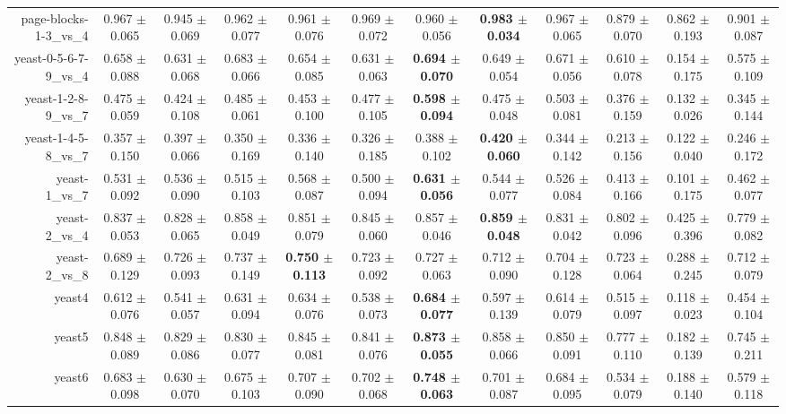 \begin{table}[!ht]
{\begin{tabular}{r c c c c c c c c c c c}
page-blocks-1-3\_vs\_4 & 0.967 $\pm$ 0.065 & 0.945 $\pm$ 0.069 & 0.962 $\pm$ 0.077 & 0.961 $\pm$ 0.076 & 0.969 $\pm$ 0.072 & 0.960 $\pm$ 0.056 & \textbf{0.983 $\pm$ 0.034} & 0.967 $\pm$ 0.065 & 0.879 $\pm$ 0.070 & 0.862 $\pm$ 0.193 & 0.901 $\pm$ 0.087 \\
yeast-0-5-6-7-9\_vs\_4 & 0.658 $\pm$ 0.088 & 0.631 $\pm$ 0.068 & 0.683 $\pm$ 0.066 & 0.654 $\pm$ 0.085 & 0.631 $\pm$ 0.063 & \textbf{0.694 $\pm$ 0.070} & 0.649 $\pm$ 0.054 & 0.671 $\pm$ 0.056 & 0.610 $\pm$ 0.078 & 0.154 $\pm$ 0.175 & 0.575 $\pm$ 0.109 \\
yeast-1-2-8-9\_vs\_7 & 0.475 $\pm$ 0.059 & 0.424 $\pm$ 0.108 & 0.485 $\pm$ 0.061 & 0.453 $\pm$ 0.100 & 0.477 $\pm$ 0.105 & \textbf{0.598 $\pm$ 0.094} & 0.475 $\pm$ 0.048 & 0.503 $\pm$ 0.081 & 0.376 $\pm$ 0.159 & 0.132 $\pm$ 0.026 & 0.345 $\pm$ 0.144 \\
yeast-1-4-5-8\_vs\_7 & 0.357 $\pm$ 0.150 & 0.397 $\pm$ 0.066 & 0.350 $\pm$ 0.169 & 0.336 $\pm$ 0.140 & 0.326 $\pm$ 0.185 & 0.388 $\pm$ 0.102 & \textbf{0.420 $\pm$ 0.060} & 0.344 $\pm$ 0.142 & 0.213 $\pm$ 0.156 & 0.122 $\pm$ 0.040 & 0.246 $\pm$ 0.172 \\
yeast-1\_vs\_7 & 0.531 $\pm$ 0.092 & 0.536 $\pm$ 0.090 & 0.515 $\pm$ 0.103 & 0.568 $\pm$ 0.087 & 0.500 $\pm$ 0.094 & \textbf{0.631 $\pm$ 0.056} & 0.544 $\pm$ 0.077 & 0.526 $\pm$ 0.084 & 0.413 $\pm$ 0.166 & 0.101 $\pm$ 0.175 & 0.462 $\pm$ 0.077 \\
yeast-2\_vs\_4 & 0.837 $\pm$ 0.053 & 0.828 $\pm$ 0.065 & 0.858 $\pm$ 0.049 & 0.851 $\pm$ 0.079 & 0.845 $\pm$ 0.060 & 0.857 $\pm$ 0.046 & \textbf{0.859 $\pm$ 0.048} & 0.831 $\pm$ 0.042 & 0.802 $\pm$ 0.096 & 0.425 $\pm$ 0.396 & 0.779 $\pm$ 0.082 \\
yeast-2\_vs\_8 & 0.689 $\pm$ 0.129 & 0.726 $\pm$ 0.093 & 0.737 $\pm$ 0.149 & \textbf{0.750 $\pm$ 0.113} & 0.723 $\pm$ 0.092 & 0.727 $\pm$ 0.063 & 0.712 $\pm$ 0.090 & 0.704 $\pm$ 0.128 & 0.723 $\pm$ 0.064 & 0.288 $\pm$ 0.245 & 0.712 $\pm$ 0.079 \\
yeast4 & 0.612 $\pm$ 0.076 & 0.541 $\pm$ 0.057 & 0.631 $\pm$ 0.094 & 0.634 $\pm$ 0.076 & 0.538 $\pm$ 0.073 & \textbf{0.684 $\pm$ 0.077} & 0.597 $\pm$ 0.139 & 0.614 $\pm$ 0.079 & 0.515 $\pm$ 0.097 & 0.118 $\pm$ 0.023 & 0.454 $\pm$ 0.104 \\
yeast5 & 0.848 $\pm$ 0.089 & 0.829 $\pm$ 0.086 & 0.830 $\pm$ 0.077 & 0.845 $\pm$ 0.081 & 0.841 $\pm$ 0.076 & \textbf{0.873 $\pm$ 0.055} & 0.858 $\pm$ 0.066 & 0.850 $\pm$ 0.091 & 0.777 $\pm$ 0.110 & 0.182 $\pm$ 0.139 & 0.745 $\pm$ 0.211 \\
yeast6 & 0.683 $\pm$ 0.098 & 0.630 $\pm$ 0.070 & 0.675 $\pm$ 0.103 & 0.707 $\pm$ 0.090 & 0.702 $\pm$ 0.068 & \textbf{0.748 $\pm$ 0.063} & 0.701 $\pm$ 0.087 & 0.684 $\pm$ 0.095 & 0.534 $\pm$ 0.079 & 0.188 $\pm$ 0.140 & 0.579 $\pm$ 0.118 \\

\end{tabular}}
\end{table}
